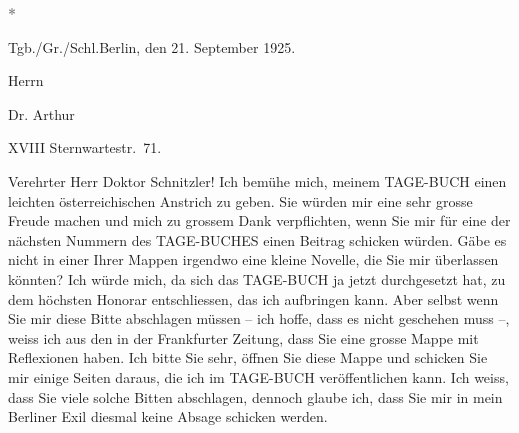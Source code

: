 \pstart
           \centering{}\textcolor{gray}{\textbf{*}}\pend
           
\pstart
           Tgb./Gr./Schl.\hfill Berlin, den 21. September 1925.\pend
           
\pstart
           \raggedleft{}Herrn\pend
           
\pstart
           \raggedleft{}Dr. Arthur \pend
           
\pstart
           \raggedleft{} XVIII\pend
           {\vspace{1\baselineskip}}
\pstart
           \raggedleft{}Sternwartestr. 71.\pend
           
\pstart\center{}Verehrter Herr Doktor Schnitzler!\pend\vspace{0.5em}
\pstart
           Ich bemühe mich, meinem TAGE-BUCH einen leichten österreichischen Anstrich
               zu geben. Sie würden mir eine sehr grosse Freude machen und mich zu grossem Dank
               verpflichten, wenn Sie mir für eine der nächsten Nummern des TAGE-BUCHES einen Beitrag schicken würden. Gäbe es nicht in einer Ihrer Mappen irgendwo
               eine kleine Novelle, die Sie mir überlassen könnten? Ich würde mich, da sich das TAGE-BUCH ja jetzt durchgesetzt hat, zu dem höchsten Honorar entschliessen, das ich
               aufbringen kann. Aber selbst wenn Sie mir diese Bitte abschlagen müssen – ich hoffe,
               dass es nicht geschehen muss –, weiss ich aus den \label{K_L02449-1v}\label{K_L02449-1} in der Frankfurter Zeitung,
               dass Sie eine grosse Mappe mit Reflexionen haben. Ich bitte Sie sehr, öffnen Sie
               diese Mappe und schicken Sie mir einige Seiten daraus, die ich im {\pb}TAGE-BUCH veröffentlichen kann. Ich weiss, dass Sie viele solche Bitten abschlagen,
               dennoch glaube ich, dass Sie mir in mein Berliner
               Exil diesmal keine Absage schicken werden.\pend
           
